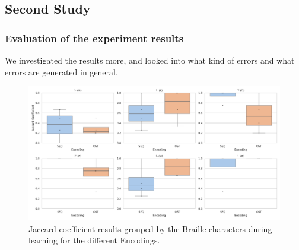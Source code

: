 





\subsection{Second Study}
\subsubsection{Evaluation of the experiment results}
We investigated the results more, and looked into what kind of errors and what errors are generated in general.

\begin{figure}
    \centering
    \includegraphics[width=\linewidth]{src/pictures/Study2Data_Experiment/Eval/learn_jaccard_coefficient.pdf}
    \caption{Jaccard coefficient results grouped by the Braille characters during learning for the different Encodings.}
    \label{fig:learning_results_secondStudy}
\end{figure}

